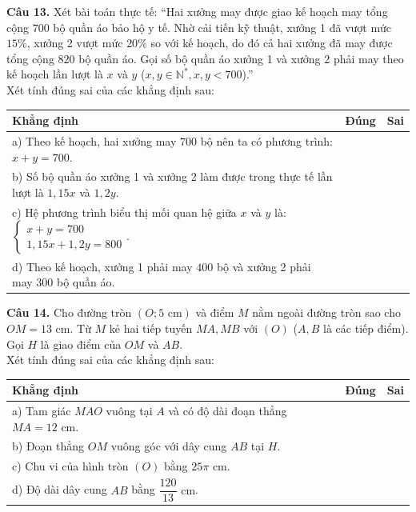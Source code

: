 \documentclass[11pt,a4paper]{article}
\begin{document}
\vspace{1.5mm}
\textbf{Câu 13.} Xét bài toán thực tế: ``Hai xưởng may được giao kế hoạch may tổng cộng $700$ bộ quần áo bảo hộ y tế. Nhờ cải tiến kỹ thuật, xưởng 1 đã vượt mức $15\%$, xưởng 2 vượt mức $20\%$ so với kế hoạch, do đó cả hai xưởng đã may được tổng cộng $820$ bộ quần áo. Gọi số bộ quần áo xưởng 1 và xưởng 2 phải may theo kế hoạch lần lượt là $x$ và $y$ ($x, y \in \mathbb{N}^*, x, y < 700$).''\\
Xét tính đúng sai của các khẳng định sau:
\begin{center}
\begin{tabularx}{\linewidth}{|X|c|c|}
\hline
\textbf{Khẳng định} & \textbf{Đúng} & \textbf{Sai} \\
\hline
a) Theo kế hoạch, hai xưởng may $700$ bộ nên ta có phương trình: $x + y = 700$. & & \\
\hline
b) Số bộ quần áo xưởng 1 và xưởng 2 làm được trong thực tế lần lượt là $1{,}15x$ và $1{,}2y$. & & \\
\hline
c) Hệ phương trình biểu thị mối quan hệ giữa $x$ và $y$ là: $\begin{cases} x + y = 700 \\ 1{,}15x + 1{,}2y = 800 \end{cases}$. & & \\
\hline
d) Theo kế hoạch, xưởng 1 phải may $400$ bộ và xưởng 2 phải may $300$ bộ quần áo. & & \\
\hline
\end{tabularx}
\end{center}

\vspace{2mm}
\textbf{Câu 14.} Cho đường tròn $(O; 5\text{ cm})$ và điểm $M$ nằm ngoài đường tròn sao cho $OM = 13\text{ cm}$. Từ $M$ kẻ hai tiếp tuyến $MA, MB$ với $(O)$ ($A, B$ là các tiếp điểm). Gọi $H$ là giao điểm của $OM$ và $AB$.\\
Xét tính đúng sai của các khẳng định sau:
\begin{center}
\begin{tabularx}{\linewidth}{|X|c|c|}
\hline
\textbf{Khẳng định} & \textbf{Đúng} & \textbf{Sai} \\
\hline
a) Tam giác $MAO$ vuông tại $A$ và có độ dài đoạn thẳng $MA = 12\text{ cm}$. & & \\
\hline
b) Đoạn thẳng $OM$ vuông góc với dây cung $AB$ tại $H$. & & \\
\hline
c) Chu vi của hình tròn $(O)$ bằng $25\pi\text{ cm}$. & & \\
\hline
d) Độ dài dây cung $AB$ bằng $\dfrac{120}{13}\text{ cm}$. & & \\
\hline
\end{tabularx}
\end{center}
\end{document}

